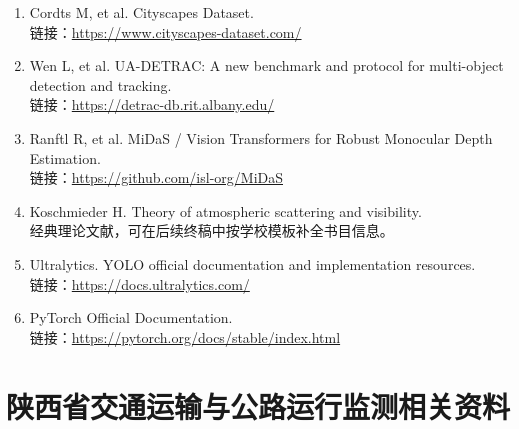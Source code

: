 \begin{enumerate}[leftmargin=2.5em]
\item Cordts M, et al. Cityscapes Dataset. \\
  链接：\url{https://www.cityscapes-dataset.com/}
\item Wen L, et al. UA-DETRAC: A new benchmark and protocol for multi-object detection and tracking. \\
  链接：\url{https://detrac-db.rit.albany.edu/}
\item Ranftl R, et al. MiDaS / Vision Transformers for Robust Monocular Depth Estimation. \\
  链接：\url{https://github.com/isl-org/MiDaS}
\item Koschmieder H. Theory of atmospheric scattering and visibility. \\
  经典理论文献，可在后续终稿中按学校模板补全书目信息。
\item Ultralytics. YOLO official documentation and implementation resources. \\
  链接：\url{https://docs.ultralytics.com/}
\item PyTorch Official Documentation. \\
  链接：\url{https://pytorch.org/docs/stable/index.html}
\end{enumerate}

\section{陕西省交通运输与公路运行监测相关资料}

